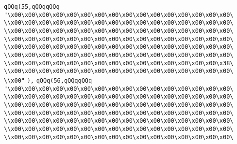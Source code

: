\verb|qQQq(55,qQQqqQQq|\newline
\verb|"\x00\x00\x00\x00\x00\x00\x00\x00\x00\x00\x00\x00\x00\x00\x00\x00\|\newline
\verb|\\x00\x00\x00\x00\x00\x00\x00\x00\x00\x00\x00\x00\x00\x00\x00\x00\|\newline
\verb|\\x00\x00\x00\x00\x00\x00\x00\x00\x00\x00\x00\x00\x00\x00\x00\x00\|\newline
\verb|\\x00\x00\x00\x00\x00\x00\x00\x00\x00\x00\x00\x00\x00\x00\x00\x00\|\newline
\verb|\\x00\x00\x00\x00\x00\x00\x00\x00\x00\x00\x00\x00\x00\x00\x00\x00\|\newline
\verb|\\x00\x00\x00\x00\x00\x00\x00\x00\x00\x00\x00\x00\x00\x00\x00\x00\|\newline
\verb|\\x00\x00\x00\x00\x00\x00\x00\x00\x00\x00\x00\x00\x00\x00\x00\x38\|\newline
\verb|\\x00\x00\x00\x00\x00\x00\x00\x00\x00\x00\x00\x00\x00\x00\x00\x00\|\newline
\verb|\\x00"|\newline
\verb|),|\newline
\verb|qQQq(56,qQQqqQQq|\newline
\verb|"\x00\x00\x00\x00\x00\x00\x00\x00\x00\x00\x00\x00\x00\x00\x00\x00\|\newline
\verb|\\x00\x00\x00\x00\x00\x00\x00\x00\x00\x00\x00\x00\x00\x00\x00\x00\|\newline
\verb|\\x00\x00\x00\x00\x00\x00\x00\x00\x00\x00\x00\x00\x00\x00\x00\x00\|\newline
\verb|\\x00\x00\x00\x00\x00\x00\x00\x00\x00\x00\x00\x00\x00\x00\x00\x00\|\newline
\verb|\\x00\x00\x00\x00\x00\x00\x00\x00\x00\x00\x00\x00\x00\x00\x00\x00\|\newline
\verb|\\x00\x00\x00\x00\x00\x00\x00\x00\x00\x00\x00\x00\x00\x00\x00\x00\|\newline
\verb|\\x00\x00\x00\x00\x00\x00\x00\x00\x00\x00\x00\x00\x00\x00\x00\x00\|\newline
